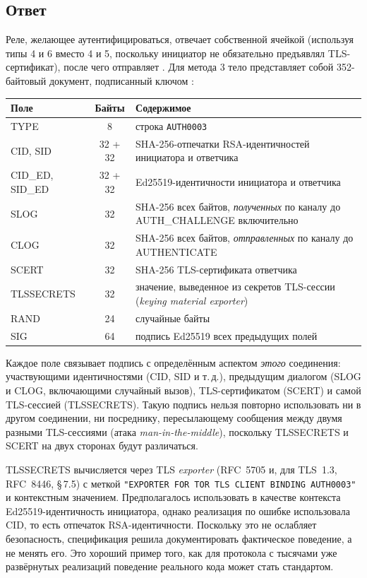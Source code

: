 \subsection{Ответ}

Реле, желающее аутентифицироваться, отвечает собственной ячейкой  (используя типы 4 и 6 вместо 4 и 5, поскольку инициатор не обязательно предъявлял TLS-сертификат), после чего отправляет . Для метода 3 тело  представляет собой 352-байтовый документ, подписанный ключом :

\begin{center}\small
\begin{tabularx}{\textwidth}{@{}l c >{\raggedright\arraybackslash}X@{}}
\toprule
Поле & Байты & Содержимое \\
\midrule
TYPE & 8 & строка \texttt{AUTH0003} \\
CID, SID & 32 + 32 & SHA-256-отпечатки RSA-идентичностей инициатора и ответчика \\
CID\_ED, SID\_ED & 32 + 32 & Ed25519-идентичности инициатора и ответчика \\
SLOG & 32 & SHA-256 всех байтов, \emph{полученных} по каналу до AUTH\_CHALLENGE включительно \\
CLOG & 32 & SHA-256 всех байтов, \emph{отправленных} по каналу до AUTHENTICATE \\
SCERT & 32 & SHA-256 TLS-сертификата ответчика \\
TLSSECRETS & 32 & значение, выведенное из секретов TLS-сессии (\emph{keying material exporter}) \\
RAND & 24 & случайные байты \\
SIG & 64 & подпись Ed25519 всех предыдущих полей \\
\bottomrule
\end{tabularx}
\end{center}

Каждое поле связывает подпись с определённым аспектом \emph{этого} соединения: участвующими идентичностями (CID, SID и т.\,д.), предыдущим диалогом (SLOG и CLOG, включающими случайный вызов), TLS-сертификатом (SCERT) и самой TLS-сессией (TLSSECRETS). Такую подпись нельзя повторно использовать ни в другом соединении, ни посреднику, пересылающему сообщения между двумя разными TLS-сессиями (атака \emph{man-in-the-middle}), поскольку TLSSECRETS и SCERT на двух сторонах будут различаться.

\begin{approfondimento}
TLSSECRETS вычисляется через TLS \emph{exporter} (RFC~5705 и, для TLS~1.3, RFC~8446, §\,7.5) с меткой \texttt{"EXPORTER FOR TOR TLS CLIENT BINDING AUTH0003"} и контекстным значением. Предполагалось использовать в качестве контекста Ed25519-идентичность инициатора, однако реализация по ошибке использовала CID, то есть отпечаток RSA-идентичности. Поскольку это не ослабляет безопасность, спецификация решила документировать фактическое поведение, а не менять его. Это хороший пример того, как для протокола с тысячами уже развёрнутых реализаций поведение реального кода может стать стандартом.
\end{approfondimento}

